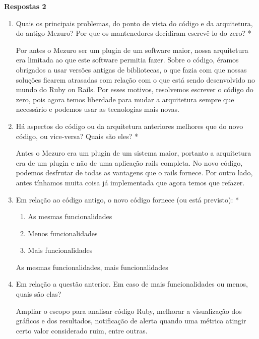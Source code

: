 \textbf{Respostas 2}

\begin{enumerate}
\item Quais os principais problemas, do ponto de vista do código e da arquitetura, do antigo Mezuro? Por que os mantenedores decidiram escrevê-lo do zero? *
  \begin{mdframed}
Por antes o Mezuro ser um plugin de um software maior, nossa arquitetura era limitada ao que este software permitia fazer. Sobre o código, éramos obrigados a usar versões antigas de bibliotecas, o que fazia com que nossas soluções ficarem atrasadas com relação com o que está sendo desenvolvido no mundo do Ruby on Rails.
Por esses motivos, resolvemos escrever o código do zero, pois agora temos liberdade para mudar a arquitetura sempre que necessário e podemos usar as tecnologias mais novas.
  \end{mdframed}
\item Há aspectos do código ou da arquitetura anteriores melhores que do novo código, ou vice-versa? Quais são eles? *
  \begin{mdframed}
Antes o Mezuro era um plugin de um sistema maior, portanto a arquitetura era de um plugin e não de uma aplicação rails completa. No novo código, podemos desfrutar de todas as vantagens que o rails fornece. Por outro lado, antes tínhamos muita coisa já implementada que agora temos que refazer.
  \end{mdframed}
\item Em relação ao código antigo, o novo código fornece (ou está previsto): *
  \begin{enumerate}
  \item As mesmas funcionalidades
  \item Menos funcionalidades
  \item Mais funcionalidades 
  \end{enumerate}
    \begin{mdframed}
As mesmas funcionalidades, mais funcionalidades
    \end{mdframed}
\item Em relação a questão anterior. Em caso de mais funcionalidades ou menos, quais são elas? 
  \begin{mdframed}
Ampliar o escopo para analisar código Ruby, melhorar a visualização dos gráficos e dos resultados, notificação de alerta quando uma métrica atingir certo valor considerado ruim, entre outras.
  \end{mdframed}
\end{enumerate}